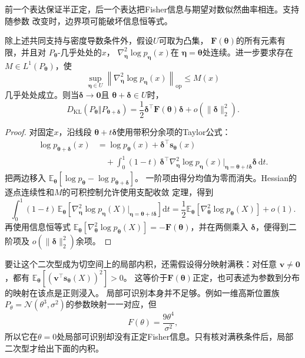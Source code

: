 前一个表达保证半正定，后一个表达把Fisher信息与期望对数似然曲率相连。支持随参数
改变时，边界项可能破坏信息恒等式。
\begin{theorem}[KL的局部二阶展开]
\label{thm:information-kl-local-fisher}
除上述共同支持与密度导数条件外，假设\(U\)可取为凸集，
\(\bm{F}(\bm{\theta})\)的所有元素有限，并且对
\(P_{\bm{\theta}}\)-几乎处处的\(x\)，
\(\nabla_{\bm{\eta}}^2\log p_{\bm{\eta}}(x)\)在
\(\bm{\eta}=\bm{\theta}\)处连续。进一步要求存在
\(M\in L^1(P_{\bm{\theta}})\)，使
\[
  \sup_{\bm{\eta}\in U}
  \left\lVert
    \nabla_{\bm{\eta}}^2\log p_{\bm{\eta}}(x)
  \right\rVert_{\mathrm{op}}
  \leq M(x)
\]
几乎处处成立。则当\(\bm{\delta}\to\bm{0}\)且
\(\bm{\theta}+\bm{\delta}\in U\)时，
\begin{equation}
  D_{\mathrm{KL}}\!\left(
    P_{\bm{\theta}}
    \Vert
    P_{\bm{\theta}+\bm{\delta}}
  \right)
  =
  \frac12
  \bm{\delta}^{\top}
  \bm{F}(\bm{\theta})
  \bm{\delta}
  +
  o(\lVert\bm{\delta}\rVert_2^2).
  \label{eq:information-kl-fisher-expansion}
\end{equation}
\end{theorem}
\begin{proof}
对固定\(x\)，沿线段
\(\bm{\theta}+t\bm{\delta}\)使用带积分余项的Taylor公式：
\[
\begin{aligned}
  \log p_{\bm{\theta}+\bm{\delta}}(x)
  &=
  \log p_{\bm{\theta}}(x)
  +
  \bm{\delta}^{\top}\bm{s}_{\bm{\theta}}(x)\\
  &\quad+
  \int_0^1(1-t)\,
  \bm{\delta}^{\top}
  \nabla_{\bm{\eta}}^2
    \log p_{\bm{\eta}}(x)
    \big|_{\bm{\eta}=\bm{\theta}+t\bm{\delta}}
  \bm{\delta}\,\mathrm{d}t.
\end{aligned}
\]
把两边移入
\(\mathbb{E}_{\bm{\theta}}[
\log p_{\bm{\theta}}-\log p_{\bm{\theta}+\bm{\delta}}]\)。
一阶项由得分均值为零而消失。Hessian的逐点连续性和\(M\)的可积控制允许使用支配收敛
定理，得到
\[
  \int_0^1(1-t)\,
  \mathbb{E}_{\bm{\theta}}\!\left[
    \nabla_{\bm{\eta}}^2\log p_{\bm{\eta}}(X)
    \big|_{\bm{\eta}=\bm{\theta}+t\bm{\delta}}
  \right]\mathrm{d}t
  =
  \frac12
  \mathbb{E}_{\bm{\theta}}\!\left[
    \nabla_{\bm{\theta}}^2\log p_{\bm{\theta}}(X)
  \right]+o(1).
\]
再使用信息恒等式
\(\mathbb{E}_{\bm{\theta}}[
\nabla_{\bm{\theta}}^2\log p_{\bm{\theta}}(X)]
=-\bm{F}(\bm{\theta})\)，并在两侧乘入
\(\bm{\delta}\)，便得到二阶项及
\(o(\lVert\bm{\delta}\rVert_2^2)\)余项。
\end{proof}
要让这个二次型成为切空间上的局部内积，还需假设得分映射满秩：对任意
\(\bm{v}\neq\bm{0}\)，都有
\(\mathbb{E}_{\bm{\theta}}[
(\bm{v}^{\top}\bm{s}_{\bm{\theta}}(X))^2]>0\)。
这等价于\(\bm{F}(\bm{\theta})\)正定，也可表述为参数到分布的映射在该点是正则浸入。
局部可识别本身并不足够。例如一维高斯位置族
\(P_\theta=\mathcal{N}(\theta^3,\sigma^2)\)的参数映射一一对应，但
\[
  F(\theta)=\frac{9\theta^4}{\sigma^2},
\]
所以它在\(\theta=0\)处局部可识别却没有正定Fisher信息。只有核对满秩条件后，局部二次型才给出下面的内积。

